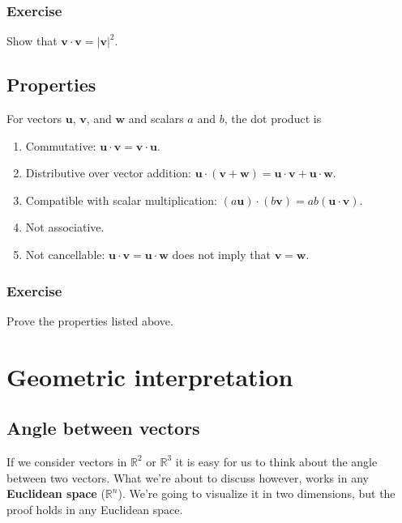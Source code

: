 \documentclass[a4paper,12pt]{amsart}
\begin{document}
    \subsubsection{Exercise} Show that $\mathbf{v} \cdot \mathbf{v} = \left| \mathbf{v} \right|^2$.

    \subsection{Properties}

    For vectors $\mathbf{u}$, $\mathbf{v}$, and $\mathbf{w}$ and scalars $a$ and $b$, the dot product is
    \begin{enumerate}
        \item Commutative: $\mathbf{u} \cdot \mathbf{v} = \mathbf{v} \cdot \mathbf{u}$.
        \item Distributive over vector addition: $\mathbf{u} \cdot (\mathbf{v} + \mathbf{w}) = \mathbf{u} \cdot \mathbf{v} + \mathbf{u} \cdot \mathbf{w}$.
        \item Compatible with scalar multiplication: $(a\mathbf{u}) \cdot (b\mathbf{v}) = ab(\mathbf{u} \cdot \mathbf{v})$.
        \item Not associative.
        \item Not cancellable: $\mathbf{u} \cdot \mathbf{v} =  \mathbf{u} \cdot \mathbf{w}$ does not imply that $\mathbf{v} = \mathbf{w}$.
    \end{enumerate}

    \subsubsection{Exercise} Prove the properties listed above.

    \section{Geometric interpretation}

    \subsection{Angle between vectors}
    
    If we consider vectors in $\mathbb{R}^2$ or $\mathbb{R}^3$ it is easy for us to think about the angle between two vectors. What we're about to discuss however, works in any \textbf{Euclidean space} ($\mathbb{R}^n$). We're going to visualize it in two dimensions, but the proof holds in any Euclidean space. 
    
\end{document}
